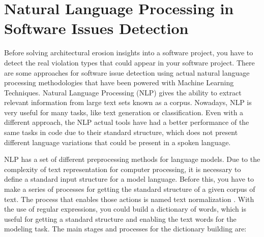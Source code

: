 \section{Natural Language Processing in Software Issues Detection}
Before solving architectural erosion insights into a software project, you have to detect the real violation types that could appear in your software project. There are some approaches for software issue detection using actual natural language processing methodologies that have been powered with Machine Learning Techniques. Natural Language Processing (NLP) gives the ability to extract relevant information from large text sets known as a corpus. Nowadays, NLP is very useful for many tasks, like text generation or classification. Even with a different approach, the NLP actual tools have had a better performance of the same tasks in code due to their standard structure, which does not present different language variations that could be present in a spoken language.

NLP has a set of different preprocessing methods for language models. Due to the complexity of text representation for computer processing, it is necessary to define a standard input structure for a model language. Before this, you have to make a series of processes for getting the standard structure of a given corpus of text. The process that enables those actions is named text normalization \citet{nlp-fundamentals}. With the use of regular expressions, you could build a dictionary of words, which is useful for getting a standard structure and enabling the text words for the modeling task. The main stages and processes for the dictionary building are:

